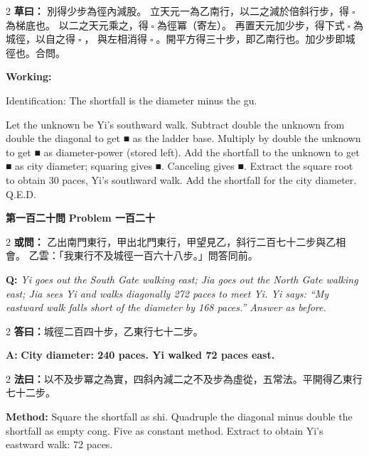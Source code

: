 \documentclass[11pt,a4paper]{article}
\let\origsquare\square
\renewcommand{\square}{\ensuremath{\origsquare}}%
\newcommand{\wen}[1]{%
  \par\vspace{0.5em}%
  \noindent\textcolor{problemcolor}{\textbf{第#1問}}%
  \hfill\textcolor{problemcolor}{\textbf{Problem #1}}\par\nopagebreak%
  \vspace{0.3em}%
}
\newcommand{\owen}[1]{%
  \noindent\textcolor{problemcolor}{\textbf{或問：}}{\tradfont #1}\par\nopagebreak%
}
\newcommand{\oweneng}[1]{%
  \noindent\textcolor{engcolor}{\textbf{Q: }}{\itshape #1}\par\nopagebreak%
}
\newcommand{\fayue}[1]{%
  \noindent\textcolor{methodcolor}{\textbf{法曰：}}{\tradfont #1}\par\nopagebreak%
}
\newcommand{\fayueeng}[1]{%
  \noindent\textcolor{engcolor}{\textbf{Method: }}{#1}\par\nopagebreak%
}
\newcommand{\tsaoyue}[1]{%
  \noindent\textcolor{workcolor}{\textbf{草曰：}}{\tradfont #1}\par%
}
\newcommand{\tsaoyueeng}[1]{%
  \noindent\textcolor{engcolor}{\textbf{Working: }}{\small #1}\par%
}
\newcommand{\dayue}[1]{%
  \noindent\textcolor{anscolor}{\textbf{答曰：}}{\tradfont #1}\par\nopagebreak%
}
\newcommand{\dayueeng}[1]{%
  \noindent\textcolor{engcolor}{\textbf{A: }}{\bfseries #1}\par\nopagebreak%
}
\begin{document}
\begin{paracol}{2}
\tsaoyue{%
別得少步為徑內減股。
立天元一為乙南行，以二之減於倍斜行步，得$ \; \square \; $為梯底也。
以二之天元乘之，得$ \; \square \; $為徑冪（寄左）。
再置天元加少步，得下式$ \; \square \; $為城徑，以自之得$ \; \square \; $，
與左相消得$ \; \square \; $。開平方得三十步，即乙南行也。加少步即城徑也。合問。}
\switchcolumn
\tsaoyueeng{%
Identification: The shortfall is the diameter minus the gu.

Let the unknown be Yi's southward walk. Subtract double the unknown from double the diagonal to get ■ as the ladder base. Multiply by double the unknown to get ■ as diameter-power (stored left). Add the shortfall to the unknown to get ■ as city diameter; squaring gives ■. Canceling gives ■. Extract the square root to obtain 30 paces, Yi's southward walk. Add the shortfall for the city diameter. Q.E.D.}
\end{paracol}

\vspace{0.5cm}

\wen{一百二十}

\begin{paracol}{2}
\owen{%
乙出南門東行，甲出北門東行，甲望見乙，斜行二百七十二步與乙相會。
乙雲：「我東行不及城徑一百六十八步。」問答同前。}
\switchcolumn
\oweneng{%
Yi goes out the South Gate walking east; Jia goes out the North Gate walking east; Jia sees Yi and walks diagonally 272 paces to meet Yi. Yi says: ``My eastward walk falls short of the diameter by 168 paces.'' Answer as before.}
\end{paracol}

\begin{paracol}{2}
\dayue{城徑二百四十步，乙東行七十二步。}
\switchcolumn
\dayueeng{City diameter: 240 paces. Yi walked 72 paces east.}
\end{paracol}

\begin{paracol}{2}
\fayue{以不及步冪之為實，四斜內減二之不及步為虛從，五常法。平開得乙東行七十二步。}
\switchcolumn
\fayueeng{Square the shortfall as shi. Quadruple the diagonal minus double the shortfall as empty cong. Five as constant method. Extract to obtain Yi's eastward walk: 72 paces.}
\end{paracol}
\end{document}
